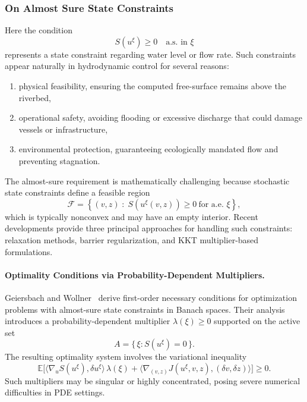 \documentclass{article}
\newcommand{\1}{\mathds{1}}          %
\theoremstyle{definition}
\begin{document}
\begin{sloppypar}
\subsubsection{On Almost Sure State Constraints}

Here the condition 
\[
S(u^{\xi}) \ge 0 
\quad\text{a.s.\ in }\xi
\]
represents a state constraint regarding water level or flow rate. Such constraints appear naturally in hydrodynamic control for several reasons:
\begin{enumerate}
    \item physical feasibility, ensuring the computed free-surface remains above the riverbed,
    \item operational safety, avoiding flooding or excessive discharge that could damage vessels or infrastructure,
    \item environmental protection, guaranteeing ecologically mandated flow and preventing stagnation.
\end{enumerate}

The almost-sure requirement is mathematically challenging because stochastic state constraints define a feasible region
\[
\mathcal{F}
=
\left\{ (v,z) \;:\; S(u^{\xi}(v,z))\ge 0 \ \text{for a.e. }\xi \right\},
\]
which is typically nonconvex and may have an empty interior. Recent developments provide three principal approaches for handling such constraints: relaxation methods, barrier regularization, and KKT multiplier-based formulations. %

\paragraph{Optimality Conditions via Probability-Dependent Multipliers.}
Geiersbach and Wollner~\cite{geiersbach2021optimality} derive first-order necessary conditions 
for optimization problems with almost-sure state constraints in Banach spaces. Their analysis introduces a probability-dependent multiplier $\lambda(\xi)\ge 0$ supported on the active set 
\[
A = \{\,\xi : S(u^{\xi}) = 0\,\}.
\]
The resulting optimality system involves the variational inequality
\[
\mathbb{E}\Big[ 
\langle \nabla_u S(u^{\xi}), \delta u^{\xi} \rangle \,\lambda(\xi)
+ \langle \nabla_{(v,z)} J(u^{\xi},v,z), (\delta v,\delta z) \rangle 
\Big]
\ge 0.
\]
Such multipliers may be singular or highly concentrated, posing severe numerical difficulties in PDE settings.


\end{sloppypar}
\end{document}
